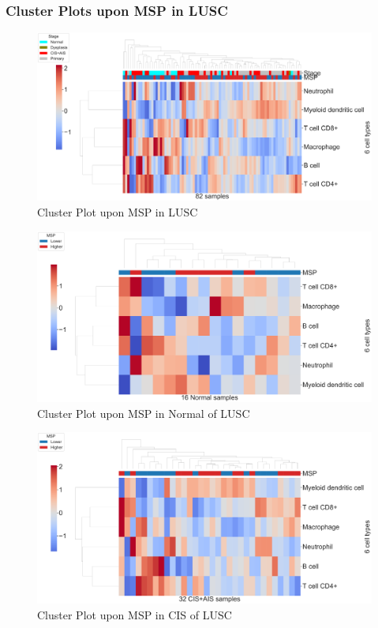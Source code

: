 \documentclass{beamer}
\begin{document}
    \begin{frame}[allowframebreaks]
        \frametitle{Cluster Plots upon MSP in LUSC}

        \begin{figure}
            \includegraphics[width=0.9 \linewidth]{figures/TIMER/Clustermap/STAR.FPKM.SQC.MSP-median/Mutation Shared Proportion-TIMER-All.pdf}
            \caption{Cluster Plot upon MSP in LUSC}
        \end{figure}

        \begin{figure}
            \includegraphics[width=0.9 \linewidth]{figures/TIMER/Clustermap/STAR.FPKM.SQC.MSP-median/Mutation Shared Proportion-TIMER-Normal.pdf}
            \caption{Cluster Plot upon MSP in Normal of LUSC}
        \end{figure}

         \begin{figure}
            \includegraphics[width=0.9 \linewidth]{figures/TIMER/Clustermap/STAR.FPKM.SQC.MSP-median/Mutation Shared Proportion-TIMER-CIS+AIS.pdf}
            \caption{Cluster Plot upon MSP in CIS of LUSC}
        \end{figure}


\end{frame}
\end{document}
